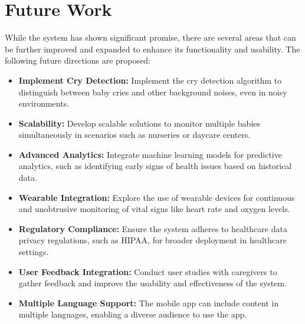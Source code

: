 \documentclass[12pt,a4paper]{report}
\begin{document}
\section{Future Work}
While the system has shown significant promise, there are several areas that can be further improved and expanded to enhance its functionality and usability. The following future directions are proposed:
\begin{itemize}
    \item \textbf{Implement Cry Detection:} Implement the cry detection algorithm to distinguish between baby cries and other background noises, even in noisy environments.
    \item \textbf{Scalability:} Develop scalable solutions to monitor multiple babies simultaneously in scenarios such as nurseries or daycare centers.
    \item \textbf{Advanced Analytics:} Integrate machine learning models for predictive analytics, such as identifying early signs of health issues based on historical data.
    \item \textbf{Wearable Integration:} Explore the use of wearable devices for continuous and unobtrusive monitoring of vital signs like heart rate and oxygen levels.
    \item \textbf{Regulatory Compliance:} Ensure the system adheres to healthcare data privacy regulations, such as HIPAA, for broader deployment in healthcare settings.
    \item \textbf{User Feedback Integration:} Conduct user studies with caregivers to gather feedback and improve the usability and effectiveness of the system.
    \item \textbf{Multiple Language Support:} The mobile app can include content in multiple languages, enabling a diverse audience to use the app.
\end{itemize}
\end{document}
